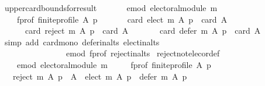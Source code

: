 \begin{isabellebody}
\isanewline
%
\endisadelimproof
\isanewline
\isanewline
{}\isamarkupfalse%
\ upper{\isacharunderscore}{\kern0pt}card{\isacharunderscore}{\kern0pt}bounds{\isacharunderscore}{\kern0pt}for{\isacharunderscore}{\kern0pt}result{\isacharcolon}{\kern0pt}\isanewline
\ \ \isanewline
\ \ \ \ e{\isacharunderscore}{\kern0pt}mod{\isacharcolon}{\kern0pt}\ {\isachardoublequoteopen}electoral{\isacharunderscore}{\kern0pt}module\ m{\isachardoublequoteclose}\ \isanewline
\ \ \ \ f{\isacharunderscore}{\kern0pt}prof{\isacharcolon}{\kern0pt}\ {\isachardoublequoteopen}finite{\isacharunderscore}{\kern0pt}profile\ A\ p{\isachardoublequoteclose}\isanewline
\ \ \isanewline
\ \ \ \ {\isachardoublequoteopen}card\ {\isacharparenleft}{\kern0pt}elect\ m\ A\ p{\isacharparenright}{\kern0pt}\ {\isasymle}\ card\ A\ {\isasymand}\isanewline
\ \ \ \ \ \ card\ {\isacharparenleft}{\kern0pt}reject\ m\ A\ p{\isacharparenright}{\kern0pt}\ {\isasymle}\ card\ A\ {\isasymand}\isanewline
\ \ \ \ \ \ card\ {\isacharparenleft}{\kern0pt}defer\ m\ A\ p{\isacharparenright}{\kern0pt}\ {\isasymle}\ card\ A\ {\isachardoublequoteclose}\isanewline
%
\isadelimproof
\ \ %
\endisadelimproof
%
\isatagproof
{}\isamarkupfalse%
\ {\isacharparenleft}{\kern0pt}simp\ add{\isacharcolon}{\kern0pt}\ card{\isacharunderscore}{\kern0pt}mono\ defer{\isacharunderscore}{\kern0pt}in{\isacharunderscore}{\kern0pt}alts\ elect{\isacharunderscore}{\kern0pt}in{\isacharunderscore}{\kern0pt}alts\isanewline
\ \ \ \ \ \ \ \ \ \ \ \ \ \ \ \ e{\isacharunderscore}{\kern0pt}mod\ f{\isacharunderscore}{\kern0pt}prof\ reject{\isacharunderscore}{\kern0pt}in{\isacharunderscore}{\kern0pt}alts{\isacharparenright}{\kern0pt}%
\endisatagproof
{\isafoldproof}%
%
\isadelimproof
\isanewline
%
\endisadelimproof
\isanewline
{}\isamarkupfalse%
\ reject{\isacharunderscore}{\kern0pt}not{\isacharunderscore}{\kern0pt}elec{\isacharunderscore}{\kern0pt}or{\isacharunderscore}{\kern0pt}def{\isacharcolon}{\kern0pt}\isanewline
\ \ \isanewline
\ \ \ \ e{\isacharunderscore}{\kern0pt}mod{\isacharcolon}{\kern0pt}\ {\isachardoublequoteopen}electoral{\isacharunderscore}{\kern0pt}module\ m{\isachardoublequoteclose}\ \isanewline
\ \ \ \ f{\isacharunderscore}{\kern0pt}prof{\isacharcolon}{\kern0pt}\ {\isachardoublequoteopen}finite{\isacharunderscore}{\kern0pt}profile\ A\ p{\isachardoublequoteclose}\isanewline
\ \ \ {\isachardoublequoteopen}reject\ m\ A\ p\ {\isacharequal}{\kern0pt}\ A\ {\isacharminus}{\kern0pt}\ {\isacharparenleft}{\kern0pt}elect\ m\ A\ p{\isacharparenright}{\kern0pt}\ {\isacharminus}{\kern0pt}\ {\isacharparenleft}{\kern0pt}defer\ m\ A\ p{\isacharparenright}{\kern0pt}{\isachardoublequoteclose}\isanewline

\end{isabellebody}
